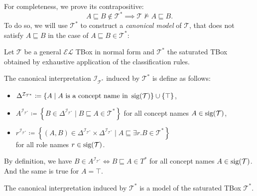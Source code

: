 For completeness, we prove its contrapositive:
\[
	A \sqsubseteq B \notin \mathcal{T}^* \implies \mathcal{T} \not\vDash A \sqsubseteq B
.\]
To do so, we will use $\mathcal{T}^*$ to construct a \textit{canonical model} of $\mathcal{T}$,
that does not satisfy $A \sqsubseteq B$ in the case of $A \sqsubseteq B \in \mathcal{T}^*$:
\begin{definition}
	Let $\mathcal{T}$ be a general $\mathcal{EL}$ TBox in normal form and $\mathcal{T}^*$ the saturated TBox
	obtained by exhaustive application of the classification rules.
	
	The canonical interpretation $\mathcal{I}_{\mathcal{T}^*}$ induced by $\mathcal{T}^*$ is define as follows:
	\begin{itemize}
		\item $\Delta^{\mathcal{I}_{\mathcal{T}^*}} \coloneqq \left\{ A \mid A \text{ is a concept name in } \operatorname{\text{sig}}(\mathcal{T}) \right\} \cup \left\{ \top \right\}$,
		\item $A^{\mathcal{I}_{\mathcal{T}^*}} \coloneqq \left\{ B \in \Delta^{\mathcal{I}_{\mathcal{T}^*}} \mid B \sqsubseteq A \in \mathcal{T}^* \right\}$ for all concept names $A \in \operatorname{\text{sig}}(\mathcal{T})$,
		\item $r^{\mathcal{I}_{\mathcal{T}^*}} \coloneqq \left\{ (A,B) \in \Delta^{\mathcal{I}_{\mathcal{T}^*}} \times \Delta^{\mathcal{I}_{\mathcal{T}^*}} \mid A \sqsubseteq \exists r.B \in \mathcal{T}^* \right\}$ \\
			for all role names $r \in \operatorname{\text{sig}}(\mathcal{T})$.
	\end{itemize}
\end{definition}
\begin{note}
	By definition, we have $B \in A^{\mathcal{I}_{\mathcal{T}^*}} \iff B \sqsubseteq A \in T^*$ for all concept names $A \in \operatorname{\text{sig}}(\mathcal{T})$.
	And the same is true for $A = \top$.
\end{note}
\begin{lemma}
	The canonical interpretation induced by $\mathcal{T}^*$ is a model of the saturated TBox $\mathcal{T}^*$.
\end{lemma}
